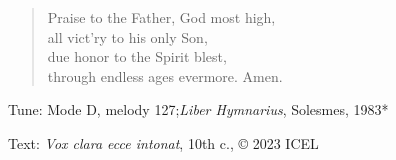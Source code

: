 \hymn



\setlength{\vleftmargin}{2em}
\begin{verse}
Praise to the Father, God most high,\\
all vict’ry to his only Son,\\
due honor to the Spirit blest,\\
through endless ages evermore. Amen.
\end{verse}

\setlength{\vleftmargin}{\defleftmargini}

\begin{hymnsource}
Tune: Mode D, melody 127;\emph{Liber Hymnarius}, Solesmes, 1983*

Text: \emph{Vox clara ecce intonat}, 10th c., © 2023 ICEL
\end{hymnsource}
